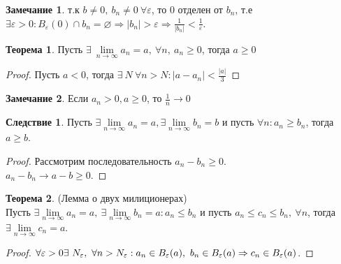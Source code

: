\documentclass[a4paper, 12pt]{article}
\renewcommand{\epsilon}{\varepsilon}
\renewcommand{\emptyset}{\varnothing}
\newcommand{\lims}{\lim\limits_{n\to \infty}}
\theoremstyle{definition}
\newtheorem*{theorem}{Теорема}
\newtheorem*{consequense}{Следствие}
\newtheorem*{comm}{Замечание}
\begin{document}
        \begin{comm}
            т.к $b\ne 0,\ b_n\ne 0\ \forall \epsilon$, то 0 отделен от $b_n$, т.е $\exists \epsilon>0: B_{\epsilon}(0)\cap b_n=\emptyset \Rightarrow |b_n|>\epsilon \Rightarrow \frac{1}{|b_n|}<\frac{1}{\epsilon}$.
        \end{comm}
        \begin{theorem}
            Пусть $\exists\ \lims a_n=a,\ \forall n,\ a_n\geq 0$, тогда $a\geq 0$
        \end{theorem} 
        \begin{proof}
            Пусть $a<0$, тогда $\exists\ N\ \forall n>N: |a-a_n|<\frac{|a|}{3}$
        \end{proof} 
        \begin{comm}
            Если $a_n>0, a\geq 0$, то $\frac{1}{n}\to 0$
        \end{comm}
        \begin{consequense}
            Пусть $\exists \lims a_n =a, \exists \lims b_n=b$ и пусть $\forall n: a_n\geq b_n$, тогда $a\geq b$.
        \end{consequense}  
        \begin{proof}
            Рассмотрим последовательность $a_n-b_n\geq 0$.\\ $a_n-b_n\to a-b\geq 0$.
        \end{proof} 
        \begin{theorem} (Лемма о двух милиционерах)\\
            Пусть $\exists \lims a_n =a,\ \exists \lims b_n=a: a_n\leq b_n$ и пусть $a_n\leq c_n\leq b_n,\ \forall n$, тогда $\exists \lims c_n=a$.
        \end{theorem} 
        \begin{proof}
            $\forall \epsilon>0 \exists \ N_{\epsilon},\ \forall n>N_{\epsilon}: a_n\in B_{\epsilon}(a),\ b_n\in B_{\epsilon}(a)\\
            \Rightarrow c_n\in B_{\epsilon}(a)$.
        \end{proof}
\end{document}
